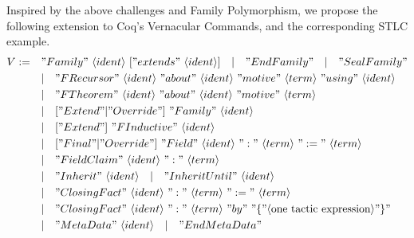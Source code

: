 Inspired by the above challenges and Family Polymorphism, we propose
the following extension to Coq's Vernacular Commands, and the corresponding STLC example.
\begin{align*}
  V := \quad &"Family"~\langle ident\rangle~["extends"~\langle ident\rangle] 
  \quad |\quad "EndFamily" \quad | \quad "SealFamily" \\
  & |\quad "FRecursor"~\langle ident\rangle~"about"~\langle ident\rangle~"motive"~\langle term\rangle~"using"~\langle ident\rangle \\
  & | \quad "FTheorem"~\langle ident\rangle~"about"~\langle ident\rangle~"motive"~\langle term\rangle \\
  & |\quad ["Extend" | "Override"]~"Family"~\langle ident\rangle \\ 
  & |\quad ["Extend"]~"FInductive"~\langle ident\rangle \\ 
  & |\quad ["Final" | "Override"]~"Field"~\langle ident\rangle~":"~\langle term \rangle~":="~\langle term \rangle \\
  & | \quad "FieldClaim"~\langle ident\rangle~":"~\langle term \rangle \\
  & | \quad "Inherit"~\langle ident\rangle \quad | \quad "Inherit Until"~\langle ident\rangle \quad \\
  & | \quad "Closing Fact"~\langle ident\rangle~":"~\langle term \rangle~":="~\langle term \rangle \\ 
  & | \quad "Closing Fact"~\langle ident\rangle~":"~\langle term \rangle~"by"~"\{"\langle \text{one tactic expression}\rangle"\}" \\ 
  & | \quad "MetaData"~\langle ident\rangle \quad | \quad "EndMetaData" \\ 
\end{align*}


